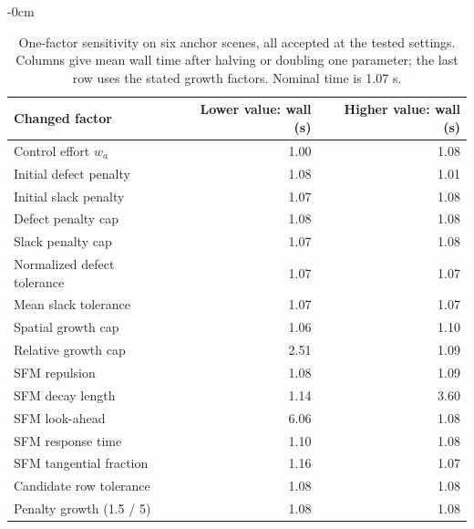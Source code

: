 \documentclass[electronics,article,submit,moreauthors]{Definitions/mdpi}
\begin{document}
\begin{table}[htbp]
\begin{adjustwidth}{-\extralength}{0cm}
\begin{mdframed}[linecolor=RevisionBlue,linewidth=.65pt,innerleftmargin=2pt,innerrightmargin=2pt,innertopmargin=3pt,innerbottommargin=3pt]
\color{RevisionBlue}
\setlength{\textwidth}{\linewidth}\setlength{\fulllength}{\linewidth}

\caption{One-factor sensitivity on six anchor scenes, all accepted at the tested settings. Columns give mean wall time after halving or doubling one parameter; the last row uses the stated growth factors. Nominal time is 1.07 s.\label{tab:sensitivity-new}}
\centering\small
\begin{tabular}{lrr}\toprule
Changed factor & Lower value: wall (s) & Higher value: wall (s)\\\midrule
Control effort $w_a$ & 1.00 & 1.08\\
Initial defect penalty & 1.08 & 1.01\\
Initial slack penalty & 1.07 & 1.08\\
Defect penalty cap & 1.08 & 1.08\\
Slack penalty cap & 1.07 & 1.08\\
Normalized defect tolerance & 1.07 & 1.07\\
Mean slack tolerance & 1.07 & 1.07\\
Spatial growth cap & 1.06 & 1.10\\
Relative growth cap & 2.51 & 1.09\\
SFM repulsion & 1.08 & 1.09\\
SFM decay length & 1.14 & 3.60\\
SFM look-ahead & 6.06 & 1.08\\
SFM response time & 1.10 & 1.08\\
SFM tangential fraction & 1.16 & 1.07\\
Candidate row tolerance & 1.08 & 1.08\\
Penalty growth (1.5 / 5) & 1.08 & 1.08\\
\bottomrule\end{tabular}
\end{mdframed}
\end{adjustwidth}
\end{table}
\end{document}
